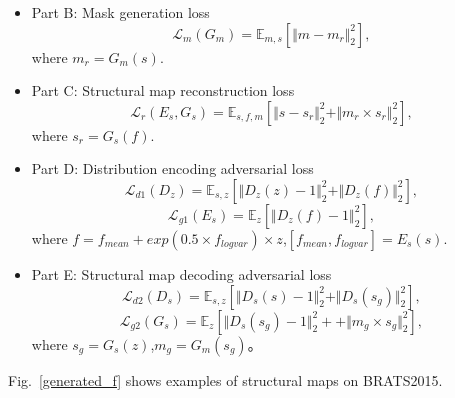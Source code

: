 \documentclass[runningheads]{llncs}
\begin{document}
\begin{itemize}
	\item{Part B: Mask generation loss}
	\begin{equation}
	\mathcal{L}_{m}(G_m)=\mathbb{E}_{m,s}[\Vert{m-m_r}\Vert_{2}^{2}],
	\end{equation}
	where $m_r=G_m(s)$.
	\item{Part C: Structural map reconstruction loss} 
	\begin{equation}
	\mathcal{L}_{r}(E_s,G_s)=\mathbb{E}_{s,f,m}[\Vert{s-s_r}\Vert_{2}^{2}+\Vert{m_r\times s_r}\Vert_{2}^{2}],
	\end{equation}
	where $s_r=G_s(f)$.
	\item{Part D: Distribution encoding adversarial loss} 
	\begin{equation}
	\mathcal{L}_{d1}(D_{z})=\mathbb{E}_{s,z}[\Vert{D_{z}(z)-1}\Vert_{2}^{2}+\Vert{D_{z}(f)}\Vert_{2}^{2}],
	\end{equation}
	\begin{equation}
	\mathcal{L}_{g1}(E_s)=\mathbb{E}_{z}[\Vert{D_{z}(f)-1}\Vert_{2}^{2}],	
	\end{equation}
	where $f=f_{mean}+exp(0.5\times f_{logvar})\times z$,$[f_{mean},f_{logvar}]=E_s(s)$.
	\item{Part E: Structural map decoding adversarial loss} 
	\begin{equation}
	\mathcal{L}_{d2}(D_{s})=\mathbb{E}_{s,z}[\Vert{D_{s}(s)-1}\Vert_{2}^{2}+\Vert{D_{s}(s_g)}\Vert_{2}^{2}],
	\end{equation}
	\begin{equation}
	\mathcal{L}_{g2}(G_s)=\mathbb{E}_{z}[\Vert{D_{s}(s_g)-1}\Vert_{2}^{2}++\Vert{m_g\times s_g}\Vert_{2}^{2}],	
	\end{equation}
	where $s_g=G_s(z)$,$m_g=G_m(s_g)$。
\end{itemize}
Fig.~\ref{generated_f} shows examples of structural maps on BRATS2015.
\end{document}
